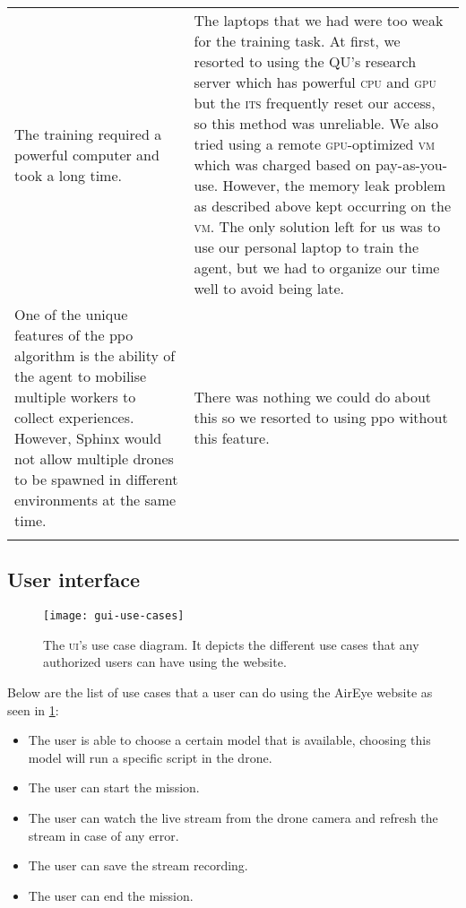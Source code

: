 \documentclass[../main.tex]{subfiles}
\begin{document}
\begin{center}
\begin{xltabular}{\textwidth}{ X X }
        The training required a powerful computer and took a long
        time.
            & 
        The laptops that we had were too weak for the training task. 
        At first, we resorted to using the QU's research server which
        has powerful \textsc{cpu} and \textsc{gpu} but the \textsc{its}
        frequently reset our access, so this method was unreliable.
        We also tried using a remote \textsc{gpu}-optimized
        \textsc{vm} which was charged based on pay-as-you-use.
        However, the memory leak problem as described above kept
        occurring on the \textsc{vm}.
        The only solution left for us was to use our personal laptop
        to train the agent, but we had to organize our time well to
        avoid being late.
            \\ \addlinespace

        One of the unique features of the \gls{ppo} algorithm is the
        ability of the agent to mobilise multiple workers to collect
        experiences. 
        However, Sphinx would not allow multiple drones to be spawned
        in different environments at the same time.
            & 
        There was nothing we could do about this so we resorted to
        using \gls{ppo} without this feature.
            \\ \addlinespace

        \bottomrule		
    \end{xltabular}
\end{center}

\subsection{User interface}

\begin{figure}[tbp] 
	\centering
	\texttt{[image: gui-use-cases]} 
        \caption{The \textsc{ui}'s use case diagram. It depicts the
        different use cases that any authorized users can have using
        the website.}
	\label{fig:gui-use-cases} 
\end{figure}

Below are the list of use cases that a user can do using the AirEye
website as seen in \cref{fig:gui-use-cases}: 
\begin{itemize}	
	\item The user is able to choose a certain model that is available, 
	choosing this model will run a specific script in the drone. 
	\item The user can start the mission.
	\item The user can watch the live stream from the drone camera and refresh 
	the stream in case of any error.

	\item The user can save the stream recording. 
	\item The user can end the mission.
\end{itemize}
\end{document}
